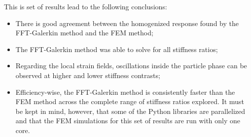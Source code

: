 This is set of results lead to the following conclusions:
\begin{itemize}
  \item There is good agreement between the homogenized response found by the FFT-Galerkin method and the FEM method;
  \item The FFT-Galerkin method was able to solve for all stiffness ratios;
  \item Regarding the local strain fields, oscillations inside the particle phase can be observed at higher and lower stiffness contrasts;
  \item Efficiency-wise, the FFT-Galerkin method is consistently faster than the FEM method across the complete range of stiffness ratios explored.
  It must be kept in mind, however, that some of the Python libraries are parallelized and that the FEM simulations for this set of results are run with only one core.
\end{itemize}

